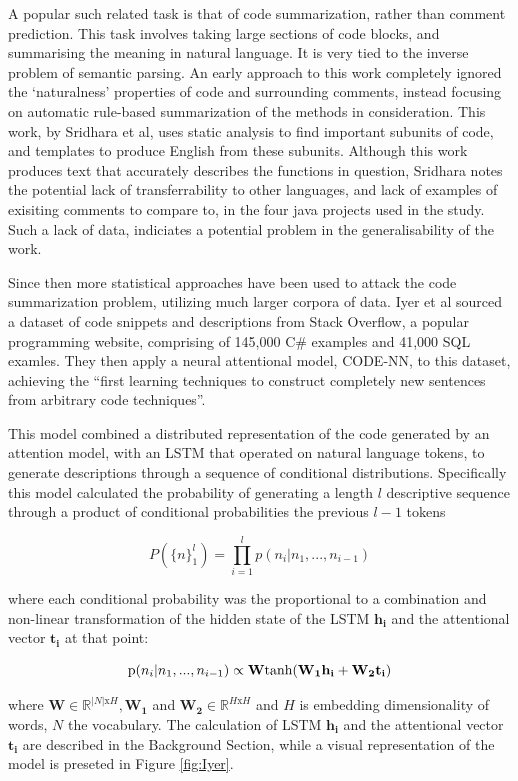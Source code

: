 A popular such related task is that of code summarization, rather than comment prediction. This task involves taking large sections of code blocks, and summarising the meaning in natural language. It is very tied to the inverse problem of semantic parsing. 
An early approach to this work completely ignored the `naturalness' properties of code and surrounding comments, instead focusing on automatic rule-based summarization of the methods in consideration. This work, by Sridhara et al\cite{sridhara_[not_2010}, uses static analysis to find important subunits of code, and templates to produce English from these subunits.
Although this work produces text that accurately describes the functions in question, Sridhara notes the potential lack of transferrability to other languages, and lack of examples of exisiting comments to compare to, in the four java projects used in the study. Such a lack of data, indiciates a potential problem in the generalisability of the work.

Since then more statistical approaches have been used to attack the code summarization problem, utilizing much larger corpora of data. Iyer et al \cite{iyer_summarizing_2016} sourced a dataset of code snippets and descriptions from Stack Overflow, a popular programming website, comprising of 145,000 C\# examples and 41,000 SQL examles. 
They then apply a neural attentional model, CODE-NN, to this dataset, achieving the ``first learning techniques to construct completely new sentences from arbitrary code techniques''.   

This model combined a distributed representation of the code generated by an attention model, with an LSTM that operated on natural language tokens, to generate descriptions through a sequence of conditional distributions. 
Specifically this model calculated the probability of generating a length $l$
descriptive sequence through a product of conditional probabilities the previous $l-1$ tokens

$$P(\{n\}_1^l) = \prod_{i=1}^lp(n_i | n_1, ..., n_{i-1} ) $$

where each conditional probability was the proportional to a combination and non-linear transformation of the hidden state of the LSTM $\mathbf{h_i}$ and the attentional vector $\mathbf{t_i}$ at that point: 

$$\text p(n_i | n_1, ..., n_{i-1} ) \propto \mathbf{W}\text{tanh}(\mathbf{W_1h_i} + \mathbf{W_2t_i})$$

where $\mathbf{W} \in \mathbb{R}^{|N|\text{x} H}, \mathbf{W_1}$ and $\mathbf{W_2} \in \mathbb{R}^{H \text{x} H}$  and $ H$ is embedding dimensionality of words, $ N $ the vocabulary.\cite{iyer_summarizing_2016}
The calculation of LSTM $\mathbf{h_i}$ and the attentional vector $\mathbf{t_i}$ are described in the Background Section, while a visual representation of the model is preseted in Figure \ref{fig:Iyer}.

